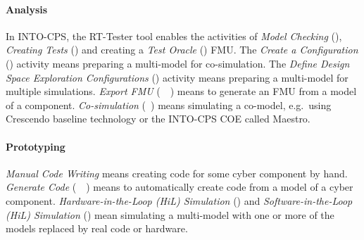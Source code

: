 \paragraph{Analysis}

In INTO-CPS, the RT-Tester tool enables the activities of \emph{Model Checking} (\RTTester), \emph{Creating Tests} (\RTTester) and creating a \emph{Test Oracle} (\RTTester) FMU. The \emph{Create a Configuration} (\INTOCPS) activity means preparing a multi-model for co-simulation. The \emph{Define Design Space Exploration Configurations} (\INTOCPS) activity means preparing a multi-model for multiple simulations. \emph{Export FMU} (\Overture~\TwentySim~\OpenModelica)  means to generate an FMU from a model of a component. \emph{Co-simulation} (\Crescendo~\INTOCPS) means simulating a co-model, e.g.\ using Crescendo baseline technology or the INTO-CPS COE called Maestro.

\paragraph{Prototyping}

\emph{Manual Code Writing} means creating code for some cyber component by hand. \emph{Generate Code} (\Overture~\TwentySim~\OpenModelica) means to automatically create code from a model of a cyber component. \emph{Hardware-in-the-Loop (HiL) Simulation} (\INTOCPS) and \emph{Software-in-the-Loop (HiL) Simulation} (\INTOCPS) mean simulating a multi-model with one or more of the models replaced by real code or hardware.


